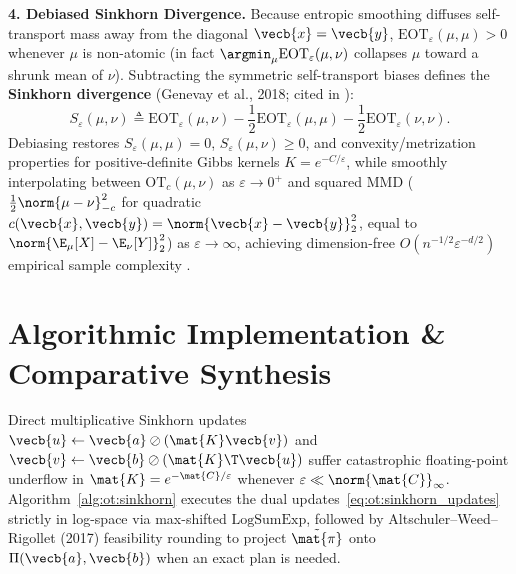 \documentclass[../../../../master.tex]{subfiles}
\begin{document}
\begin{coremath}
\textbf{4. Debiased Sinkhorn Divergence.} Because entropic smoothing diffuses self-transport mass away from the diagonal $\vecb{x}=\vecb{y}$, $\mathrm{EOT}_\varepsilon(\mu, \mu) > 0$ whenever $\mu$ is non-atomic (in fact $\argmin_\mu \mathrm{EOT}_\varepsilon(\mu, \nu)$ collapses $\mu$ toward a shrunk mean of $\nu$). Subtracting the symmetric self-transport biases defines the \textbf{Sinkhorn divergence} (Genevay et al., 2018; cited in ):
\begin{equation}
\label{eq:ot:sinkhorn_divergence}
  S_\varepsilon(\mu, \nu) \triangleq \mathrm{EOT}_\varepsilon(\mu, \nu) - \frac{1}{2}\mathrm{EOT}_\varepsilon(\mu, \mu) - \frac{1}{2}\mathrm{EOT}_\varepsilon(\nu, \nu).
\end{equation}
Debiasing restores $S_\varepsilon(\mu, \mu) = 0$, $S_\varepsilon(\mu, \nu) \ge 0$, and convexity/metrization properties for positive-definite Gibbs kernels $K = e^{-C/\varepsilon}$, while smoothly interpolating between $\mathrm{OT}_c(\mu, \nu)$ as $\varepsilon \to 0^+$ and squared MMD ($\frac{1}{2}\norm{\mu - \nu}_{-c}^2$ for quadratic $c(\vecb{x},\vecb{y}) = \norm{\vecb{x}-\vecb{y}}_2^2$, equal to $\norm{\E_\mu[X] - \E_\nu[Y]}_2^2$) as $\varepsilon \to \infty$, achieving dimension-free $O(n^{-1/2}\varepsilon^{-d/2})$ empirical sample complexity .
\end{coremath}

\section{Algorithmic Implementation \& Comparative Synthesis}
\label{sec:ot:algorithms}

Direct multiplicative Sinkhorn updates $\vecb{u} \leftarrow \vecb{a} \oslash (\mat{K}\vecb{v})$ and $\vecb{v} \leftarrow \vecb{b} \oslash (\mat{K}\T\vecb{u})$ suffer catastrophic floating-point underflow in $\mat{K} = e^{-\mat{C}/\varepsilon}$ whenever $\varepsilon \ll \norm{\mat{C}}_\infty$. Algorithm~\ref{alg:ot:sinkhorn} executes the dual updates~\eqref{eq:ot:sinkhorn_updates}  strictly in log-space via max-shifted $\mathrm{LogSumExp}$, followed by Altschuler--Weed--Rigollet (2017) feasibility rounding  to project $\tilde{\mat{\pi}}$ onto $\Pi(\vecb{a}, \vecb{b})$ when an exact plan is needed.
\end{document}
